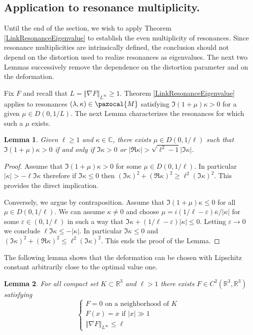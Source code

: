 \documentclass[a4paper, 12pt]{amsart}
\numberwithin{equation}{section}
\newtheorem{lemma}{Lemma}[section]
\newcommand{\C}{\mathbb{C}} %
\newcommand{\R}{\mathbb{R}} %
\newcommand{\lv}{\left\vert} %
\newcommand{\rv}{\right\vert} %
\newcommand{\lV}{\left\Vert} %
\newcommand{\rV}{\right\Vert} %
\newcommand{\Mpaz}{\pazocal{M}}
\begin{document}
\subsection{Application to resonance multiplicity.} Until the end of the section, we wish to apply Theorem \ref{LinkResonanceEigenvalue} to establish the even multiplicity of resonances. Since resonance multiplicities are intrinsically defined, the conclusion should not depend on the distortion used to realize resonances as eigenvalues. The next two Lemmas successively remove the dependence on the distortion parameter and on the deformation.

Fix $F$ and recall that $L=\lV\nabla F\rV_{L^\infty}\geq 1$. Theorem \ref{LinkResonanceEigenvalue} applies to resonances $(\lambda,\kappa)\in\Mpaz$ satisfying $\Im(1+\mu)\kappa>0$ for a given $\mu\in D(0,1/L)$. The next Lemma characterizes the resonances for which such a $\mu$ exists. 

\begin{lemma}\label{CatchedResonances}
    Given $\ell\geq1$ and $\kappa\in\C$, there exists $\mu\in D(0,1/\ell)$ such that $\Im(1+\mu)\kappa>0$ if and only if $\Im\kappa>0$ or $\lv\Re\kappa\rv>\sqrt{\ell^2-1}\lv\Im\kappa\rv$.
\end{lemma}

\begin{proof}
    Assume that $\Im(1+\mu)\kappa>0$ for some $\mu\in D(0,1/ \ell)$. In particular $\lv\kappa\rv>- \ell\Im\kappa$ therefore if $\Im\kappa\leq 0$ then $(\Im\kappa)^2+(\Re\kappa)^2\geq  \ell^2(\Im\kappa)^2$. This provides the direct implication. 
    
    Conversely, we argue by contraposition. Assume that $\Im(1+\mu)\kappa\leq0$ for all $\mu\in D(0,1/ \ell)$. We can assume $\kappa\not=0$ and choose $\mu=i(1/ \ell-\varepsilon)\overline{\kappa}/\lv\kappa\rv$ for some $\varepsilon\in(0,1/ \ell)$ in such a way that $\Im\kappa+(1/ \ell-\varepsilon)\lv\kappa\rv\leq0$. Letting $\varepsilon\to0$ we conclude $ \ell\Im\kappa\leq-\lv\kappa\rv$. In particular $\Im\kappa\leq 0$ and $(\Im\kappa)^2+(\Re\kappa)^2\leq  \ell^2(\Im\kappa)^2$. This ends the proof of the Lemma.
\end{proof}

The following lemma shows that the deformation can be chosen with Lipschitz constant arbitrarily close to the optimal value one.

\begin{lemma}\label{FChoice}
    For all compact set $K\subset\R^3$ and $\ell>1$ there exists $F\in C^2(\R^3,\R^3)$ satisfying
    \begin{equation*}
        \left\{
        \begin{array}{ll}
            F=0 \mbox{ on a neighborhood of } K\\

            F(x)=x \mbox{ if } \lv x\rv\gg 1\\
            
            \lV \nabla F\rV_{L^\infty}\leq\ell
        \end{array}
        \right.
    \end{equation*}
\end{lemma}
\end{document}
